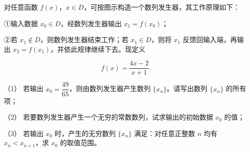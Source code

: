 \begin{question}
对任意函数 $f(x)$，$x\in D$，可按图示构造一个数列发生器，其工作原理如下：

①输入数据 $x_0\in D$，经数列发生器输出 $x_1=f(x_0)$；

②若 $x_1\notin D$，则数列发生器结束工作；若 $x_1\in D$，则将 $x_1$ 反馈回输入端，再输出 $x_2=f(x_1)$，并依此规律继续下去。现定义

\nopagebreak[4]
\[
f(x)=\frac{4x-2}{x+1}.
\]
\nopagebreak[4]
\begin{center}\end{center}
\nopagebreak[4]
（1） 若输出 $x_0=\dfrac{49}{65}$，则由数列发生器产生数列 $\{x_n\}$。请写出数列 $\{x_n\}$ 的所有项；

（2） 若要数列发生器产生一个无穷的常数数列，试求输出的初始数据 $x_0$ 的值；

（3） 若输出 $x_0$ 时，产生的无穷数列 $\{x_n\}$ 满足：对任意正整数 $n$ 均有 $x_n<x_{n+1}$，求 $x_0$ 的取值范围。

\end{question}